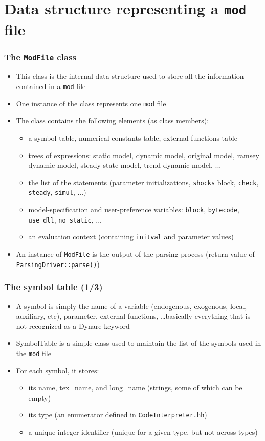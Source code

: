 \documentclass{beamer}
\begin{document}
\section{Data structure representing a \texttt{mod} file}

\begin{frame}
  \frametitle{The \texttt{ModFile} class}
  \begin{itemize}
  \item This class is the internal data structure used to store all the information contained in a \texttt{mod} file
  \item One instance of the class represents one \texttt{mod} file
  \item The class contains the following elements (as class members):
    \begin{itemize}
    \item a symbol table, numerical constants table, external functions table
    \item trees of expressions: static model, dynamic model, original model, ramsey dynamic model, steady state model, trend dynamic model, ...
    \item the list of the statements (parameter initializations, \texttt{shocks} block, \texttt{check}, \texttt{steady}, \texttt{simul}, ...)
    \item model-specification and user-preference variables: \texttt{block}, \texttt{bytecode}, \texttt{use\_dll}, \texttt{no\_static}, ...
    \item an evaluation context (containing \texttt{initval} and parameter values)
    \end{itemize}
  \item An instance of \texttt{ModFile} is the output of the parsing process (return value of \texttt{ParsingDriver::parse()})
  \end{itemize}
\end{frame}

\begin{frame}
  \frametitle{The symbol table (1/3)}
  \begin{itemize}
  \item A \alert{symbol} is simply the name of a variable (endogenous, exogenous, local, auxiliary, etc), parameter, external functions, \ldots basically everything that is not recognized as a Dynare keyword
  \item \alert{SymbolTable} is a simple class used to maintain the list of the symbols used in the \texttt{mod} file
  \item For each symbol, it stores:
    \begin{itemize}
    \item its name, tex\_name, and long\_name (strings, some of  which can be empty)
    \item its type (an enumerator defined in \texttt{CodeInterpreter.hh})
    \item a unique integer identifier (unique for a given type, but not across types)
    \end{itemize}
  \end{itemize}
\end{frame}
\end{document}
